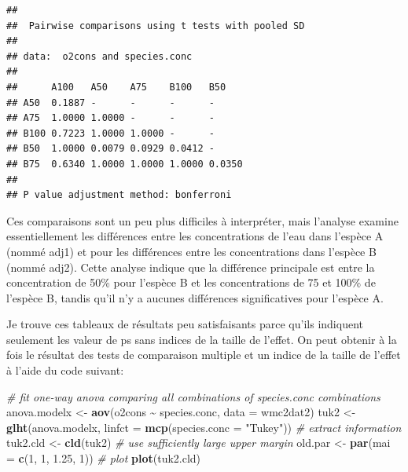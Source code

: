 \documentclass[
  12pt,
]{book}
\newenvironment{Shaded}{\begin{snugshade}}{\end{snugshade}}
\newcommand{\CommentTok}[1]{\textcolor[rgb]{0.56,0.35,0.01}{\textit{#1}}}
\newcommand{\DataTypeTok}[1]{\textcolor[rgb]{0.13,0.29,0.53}{#1}}
\newcommand{\DecValTok}[1]{\textcolor[rgb]{0.00,0.00,0.81}{#1}}
\newcommand{\FloatTok}[1]{\textcolor[rgb]{0.00,0.00,0.81}{#1}}
\newcommand{\KeywordTok}[1]{\textcolor[rgb]{0.13,0.29,0.53}{\textbf{#1}}}
\newcommand{\NormalTok}[1]{#1}
\newcommand{\OperatorTok}[1]{\textcolor[rgb]{0.81,0.36,0.00}{\textbf{#1}}}
\newcommand{\StringTok}[1]{\textcolor[rgb]{0.31,0.60,0.02}{#1}}
\begin{document}
\begin{verbatim}
## 
##  Pairwise comparisons using t tests with pooled SD 
## 
## data:  o2cons and species.conc 
## 
##      A100   A50    A75    B100   B50   
## A50  0.1887 -      -      -      -     
## A75  1.0000 1.0000 -      -      -     
## B100 0.7223 1.0000 1.0000 -      -     
## B50  1.0000 0.0079 0.0929 0.0412 -     
## B75  0.6340 1.0000 1.0000 1.0000 0.0350
## 
## P value adjustment method: bonferroni
\end{verbatim}

Ces comparaisons sont un peu plus difficiles à interpréter, mais l'analyse examine essentiellement les différences entre les concentrations de l'eau dans l'espèce A (nommé adj1) et pour les différences entre les concentrations dans l'espèce B (nommé adj2). Cette analyse indique que la différence principale est entre la concentration de 50\% pour l'espèce B et les concentrations de 75 et 100\% de l'espèce B, tandis qu'il n'y a aucunes différences significatives pour l'espèce A.

Je trouve ces tableaux de résultats peu satisfaisants parce qu'ils indiquent seulement les valeur de ps sans indices de la taille de l'effet. On peut obtenir à la fois le résultat des tests de comparaison multiple et un indice de la taille de l'effet à l'aide du code suivant:

\begin{Shaded}
\begin{Highlighting}[]
\CommentTok{\# fit one{-}way anova comparing all combinations of species.conc combinations}
\NormalTok{anova.modelx \textless{}{-}}\StringTok{ }\KeywordTok{aov}\NormalTok{(o2cons }\OperatorTok{\textasciitilde{}}\StringTok{ }\NormalTok{species.conc, }\DataTypeTok{data =}\NormalTok{ wmc2dat2)}
\NormalTok{tuk2 \textless{}{-}}\StringTok{ }\KeywordTok{glht}\NormalTok{(anova.modelx, }\DataTypeTok{linfct =} \KeywordTok{mcp}\NormalTok{(}\DataTypeTok{species.conc =} \StringTok{"Tukey"}\NormalTok{))}
\CommentTok{\# extract information}
\NormalTok{tuk2.cld \textless{}{-}}\StringTok{ }\KeywordTok{cld}\NormalTok{(tuk2)}
\CommentTok{\# use sufficiently large upper margin}
\NormalTok{old.par \textless{}{-}}\StringTok{ }\KeywordTok{par}\NormalTok{(}\DataTypeTok{mai =} \KeywordTok{c}\NormalTok{(}\DecValTok{1}\NormalTok{, }\DecValTok{1}\NormalTok{, }\FloatTok{1.25}\NormalTok{, }\DecValTok{1}\NormalTok{))}
\CommentTok{\# plot}
\KeywordTok{plot}\NormalTok{(tuk2.cld)}
\end{Highlighting}
\end{Shaded}
\end{document}
